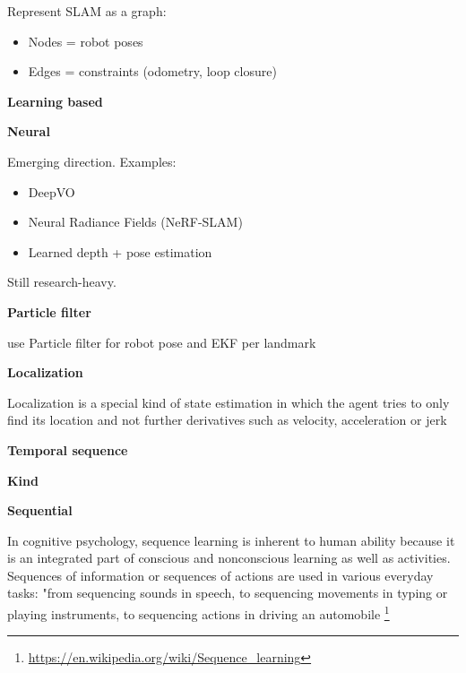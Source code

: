 \documentclass{book}
\providecommand{\ProjectDeepHeading}[2]{%
    \par\medskip\noindent\textbf{#2}\par\smallskip
}
\providecommand{\seeherefooter}[1]{\footnote{\url{#1}}}
\begin{document}
Represent SLAM as a graph:
    \begin{itemize}
        \item Nodes = robot poses
        \item Edges = constraints (odometry, loop closure)
    \end{itemize}

\ProjectDeepHeading{7}{Learning based}

\ProjectDeepHeading{8}{Neural}


Emerging direction.
    Examples:
    \begin{itemize}
    
        \item DeepVO
        \item Neural Radiance Fields (NeRF-SLAM)
        \item Learned depth + pose estimation
    \end{itemize}
    
    Still research-heavy.

\ProjectDeepHeading{7}{Particle filter}


use Particle filter for robot pose and EKF per landmark

\ProjectDeepHeading{6}{Localization}


Localization is a special kind of state estimation in which the agent tries to only find its location and not further derivatives such as velocity, acceleration or jerk

\ProjectDeepHeading{4}{Temporal sequence}

\ProjectDeepHeading{5}{Kind}

\ProjectDeepHeading{6}{Sequential}


In cognitive psychology, sequence learning is inherent to human ability because it is an integrated part of conscious and nonconscious learning as well as activities. Sequences of information or sequences of actions are used in various everyday tasks: "from sequencing sounds in speech, to sequencing movements in typing or playing instruments, to sequencing actions in driving an automobile \seeherefooter{https://en.wikipedia.org/wiki/Sequence_learning}
\end{document}
